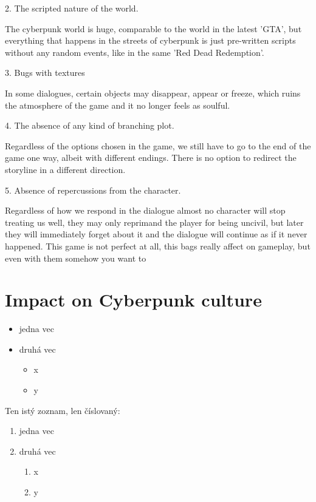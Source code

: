 \documentclass[10pt,twoside,english,a4paper]{article}
\begin{document}
2. The scripted nature of the world.

The cyberpunk world is huge, comparable to the world in the latest 'GTA', but everything that happens in the streets of cyberpunk is just pre-written scripts without any random events, like in the same 'Red Dead Redemption'.

3. Bugs with textures

In some dialogues, certain objects may disappear, appear or freeze, which ruins the atmosphere of the game and it no longer feels as soulful.

4. The absence of any kind of branching plot.

Regardless of the options chosen in the game, we still have to go to the end of the game one way, albeit with different endings. There is no option to redirect the storyline in a different direction.

5. Absence of repercussions from the character.

Regardless of how we respond in the dialogue almost no character will stop treating us well, they may only reprimand the player for being uncivil, but later they will immediately forget about it and the dialogue will continue as if it never happened.
This game is not perfect at all, this bags really affect on gameplay, but even with them somehow you want to
\section{Impact on Cyberpunk culture}\label{culture}
\cite {Sun2022}
\begin{itemize}
\item jedna vec
\item druhá vec
	\begin{itemize}
	\item x
	\item y
	\end{itemize}
\end{itemize}

Ten istý zoznam, len číslovaný:

\begin{enumerate}
\item jedna vec
\item druhá vec
	\begin{enumerate}
	\item x
	\item y
	\end{enumerate}
\end{enumerate}
\end{document}
